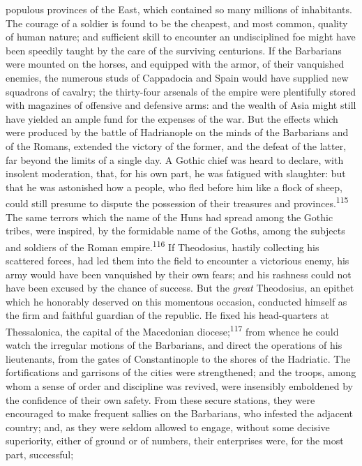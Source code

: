 populous provinces of the East, which contained so many millions
of inhabitants. The courage of a soldier is found to be the
cheapest, and most common, quality of human nature; and
sufficient skill to encounter an undisciplined foe might have
been speedily taught by the care of the surviving centurions. If
the Barbarians were mounted on the horses, and equipped with the
armor, of their vanquished enemies, the numerous studs of
Cappadocia and Spain would have supplied new squadrons of
cavalry; the thirty-four arsenals of the empire were plentifully
stored with magazines of offensive and defensive arms: and the
wealth of Asia might still have yielded an ample fund for the
expenses of the war. But the effects which were produced by the
battle of Hadrianople on the minds of the Barbarians and of the
Romans, extended the victory of the former, and the defeat of the
latter, far beyond the limits of a single day. A Gothic chief was
heard to declare, with insolent moderation, that, for his own
part, he was fatigued with slaughter: but that he was astonished
how a people, who fled before him like a flock of sheep, could
still presume to dispute the possession of their treasures and
provinces.\textsuperscript{115} The same terrors which the name of the Huns had
spread among the Gothic tribes, were inspired, by the formidable
name of the Goths, among the subjects and soldiers of the Roman
empire.\textsuperscript{116} If Theodosius, hastily collecting his scattered
forces, had led them into the field to encounter a victorious
enemy, his army would have been vanquished by their own fears;
and his rashness could not have been excused by the chance of
success. But the \textit{great} Theodosius, an epithet which he
honorably deserved on this momentous occasion, conducted himself
as the firm and faithful guardian of the republic. He fixed his
head-quarters at Thessalonica, the capital of the Macedonian
diocese;\textsuperscript{117} from whence he could watch the irregular motions of
the Barbarians, and direct the operations of his lieutenants,
from the gates of Constantinople to the shores of the Hadriatic.
The fortifications and garrisons of the cities were strengthened;
and the troops, among whom a sense of order and discipline was
revived, were insensibly emboldened by the confidence of their
own safety. From these secure stations, they were encouraged to
make frequent sallies on the Barbarians, who infested the
adjacent country; and, as they were seldom allowed to engage,
without some decisive superiority, either of ground or of
numbers, their enterprises were, for the most part, successful;

